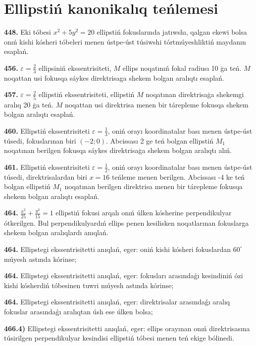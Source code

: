 \section{Ellipstiń kanonikalıq teńlemesi}



\textbf{448.} Eki tóbesi $x^2+5 y^2=20$ ellipstiń fokuslarında jatıwshı, qalgan ekewi bolsa onıń kishi kósheri tóbeleri menen ústpe-úst túsiwshi tórtmúyeshliktiń maydanın esaplań.


\textbf{456.} $\varepsilon=\frac{2}{3}$ ellipsiniń ekssentrisiteti, $M$ ellips noqatınıń fokal radiusı 10 ģa teń. $M$ noqattan usi fokusqa sáykes direktrisaga shekem bolgan aralıqtı esaplań.


\textbf{457.} $\varepsilon=\frac{2}{5}$ ellipstiń ekssentrisiteti, ellipstiń $M$ noqatınan direktrisaģa shekemgi aralıq 20 ģa teń. $M$ noqattan usi direktrisa menen bir tárepleme fokusqa shekem bolgan aralıqtı esaplań.

\textbf{460.} Ellipstiń ekssentrisiteti $\varepsilon=\frac{1}{3}$, oniń orayı koordinatalar bası menen ústpe-úst túsedi, fokuslarınan biri $ (-2; 0) $. Abcissası 2 ge teń bolgan ellipstiń $M_1$ noqatınan berilgen fokusqa sáykes direktrisaģa shekem bolgan aralıqtı alıń.

\textbf{461.} Ellipstiń ekssentrisiteti $\varepsilon=\frac{1}{2}$, oniń orayı koordinatalar bası menen ústpe-úst túsedi, direktrisalardan biri $x=16$ teńleme menen berilgen. Abcissası -4 ke teń bolgan ellipstiń $M_1$ noqatınan berilgen direktrisa menen bir tárepleme fokusqa shekem bolgan aralıqtı esaplań.

\textbf{464.} $\frac{x^2}{25}+\frac{y^2}{15}=1$ ellipstiń fokusi arqalı onıń úlken kósherine perpendikulyar ótkerilgen. Bul perpendikulyardıń ellips penen kesilisken noqatlarınan fokuslarga shekem bolgan aralıqlardı anıqlań.

\textbf{464.} Ellipstegi ekssentrisitetti anıqlań, eger: oniń kishi kósheri fokuslardan $60^{\circ}$ múyesh astında kórinse;

\textbf{464.} Ellipstegi ekssentrisitetti anıqlań, eger: fokusları arasındaǵı kesindiniń ózi kishi kósherdiń tóbesinen tuwri múyesh astında kórinse;

\textbf{464.} Ellipstegi ekssentrisitetti anıqlań, eger: direktrisalar arasındaǵı aralıq fokuslar arasındaǵı aralıqtan úsh ese úlken bolsa;

\textbf{466.4)} Ellipstegi ekssentrisitetti anıqlań, eger: ellips orayınan onıń direktrisasına túsirilgen perpendikulyar kesindisi ellipstiń tóbesi menen teń ekige bólinedi.

